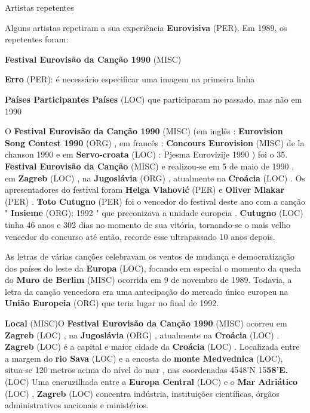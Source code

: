 \documentclass[12pt,a4paper]{article}
\begin{document}
Artistas repetentes

Alguns artistas repetiram a sua experiência \textbf{Eurovisiva} (PER). Em 1989, os repetentes foram:



\textbf{Festival Eurovisão da Canção 1990} (MISC)



\textbf{Erro} (PER): é necessário especificar uma imagem na primeira linha

\textbf{Países Participantes Países} (LOC) que participaram no passado, mas não em 1990

O \textbf{Festival Eurovisão da Canção 1990} (MISC) (em inglês : \textbf{Eurovision Song Contest 1990} (ORG) , em francês : \textbf{Concours Eurovision} (MISC) de la chanson 1990 e em \textbf{Servo-croata} (LOC) : Pjesma Eurovizije 1990 ) foi o 35. \textbf{Festival Eurovisão da Canção} (MISC) e realizou-se em 5 de maio de 1990 , em \textbf{Zagreb} (LOC) , na \textbf{Jugoslávia} (ORG) , atualmente na \textbf{Croácia} (LOC) . Os apresentadores do festival foram \textbf{Helga Vlahović} (PER) e \textbf{Oliver Mlakar} (PER) . \textbf{Toto Cutugno} (PER) foi o vencedor do festival deste ano com a canção " \textbf{Insieme} (ORG): 1992 " que preconizava a unidade europeia . \textbf{Cutugno} (LOC) tinha 46 anos e 302 dias no momento de sua vitória, tornando-se o mais velho vencedor do concurso até então, recorde esse ultrapassado 10 anos depois.

As letras de várias canções celebravam os ventos de mudança e democratização dos países do leste da \textbf{Europa} (LOC), focando em especial o momento da queda do \textbf{Muro de Berlim} (MISC) ocorrida em 9 de novembro de 1989. Todavia, a letra da canção vencedora era uma antecipação do mercado único europeu na \textbf{União Europeia} (ORG) que teria lugar no final de 1992.



\textbf{Local} (MISC)O \textbf{Festival Eurovisão da Canção 1990} (MISC) ocorreu em \textbf{Zagreb} (LOC) , na \textbf{Jugoslávia} (ORG) , atualmente na \textbf{Croácia} (LOC) . \textbf{Zagreb} (LOC) é a capital e maior cidade da \textbf{Croácia} (LOC) . Localizada entre a margem do \textbf{rio Sava} (LOC) e a encosta do \textbf{monte Medvednica} (LOC), situa-se 120 metros acima do nível do mar , nas coordenadas 4548'N 15\textbf{58'E.} (LOC) Uma encruzilhada entre a \textbf{Europa Central} (LOC) e o \textbf{Mar Adriático} (LOC) , \textbf{Zagreb} (LOC) concentra indústria, instituições científicas, órgãos administrativos nacionais e ministérios.
\end{document}
